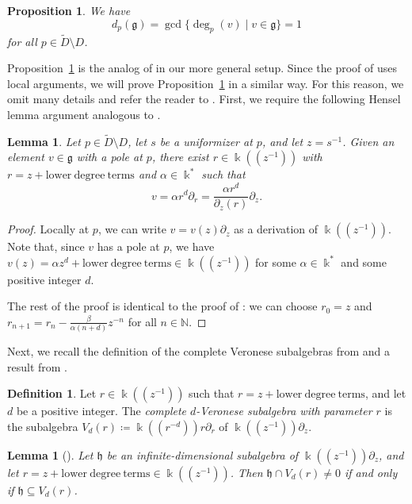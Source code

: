 \documentclass[12pt]{amsart}
\theoremstyle{plain}
\newtheorem{proposition}[theorem]{Proposition}
\newtheorem{lemma}[theorem]{Lemma}
\theoremstyle{definition}
\newtheorem{definition}[theorem]{Definition}
\numberwithin{equation}{section}
\def\g{\mathfrak{g}}
\def\h{\mathfrak{h}}
\def\NN{\mathbb{N}}
\def\kk{\Bbbk}
\def\del{\partial}
\begin{document}
\begin{proposition}\label{prop:g has almost all poles}
    We have
    $$d_p(\g) = \gcd\{\deg_p(v) \mid v \in \g\} = 1$$
    for all $p \in \widetilde{D} \setminus D$.
\end{proposition}

Proposition~\ref{prop:g has almost all poles} is the analog of \cite[Proposition 3.1]{BellBuzaglo} in our more general setup. Since the proof of \cite[Proposition 3.1]{BellBuzaglo} uses local arguments, we will prove Proposition~\ref{prop:g has almost all poles} in a similar way. For this reason, we omit many details and refer the reader to \cite{BellBuzaglo}. First, we require the following Hensel lemma argument analogous to \cite[Lemma 3.2]{BellBuzaglo}.

\begin{lemma}\label{lem:Hensel}
    Let $p \in \widetilde{D} \setminus D$, let $s$ be a uniformizer at $p$, and let $z = s^{-1}$. Given an element $v \in \g$ with a pole at $p$, there exist $r \in \kk((z^{-1}))$ with $r = z + \mathrm{lower~degree~terms}$ and $\alpha \in \kk^*$ such that
    $$v = \alpha r^d \del_r = \frac{\alpha r^d}{\del_z(r)}\del_z.$$
\end{lemma}
\begin{proof}
    Locally at $p$, we can write $v = v(z) \del_z$ as a derivation of $\kk((z^{-1}))$. Note that, since $v$ has a pole at $p$, we have $v(z) = \alpha z^d + \mathrm{lower~degree~terms} \in \kk((z^{-1}))$ for some $\alpha \in \kk^*$ and some positive integer $d$.

    The rest of the proof is identical to the proof of \cite[Lemma 3.2]{BellBuzaglo}: we can choose $r_0 = z$ and $r_{n + 1} = r_n - \frac{\beta}{\alpha (n + d)} z^{-n}$ for all $n \in \NN$.
\end{proof}

Next, we recall the definition of the complete Veronese subalgebras from \cite[Notation 3.3]{BellBuzaglo} and a result from \cite{BellBuzaglo}.

\begin{definition}
    Let $r \in \kk((z^{-1}))$ such that $r = z + \mathrm{lower~degree~terms}$, and let $d$ be a positive integer. The \emph{complete $d$-Veronese subalgebra with parameter $r$} is the subalgebra $V_d(r) \coloneqq \kk((r^{-d}))r\del_r$ of $\kk((z^{-1}))\del_z$.
\end{definition}

\begin{lemma}[{\cite[Corollary 3.5]{BellBuzaglo}}]\label{lem:contained in Veronese}
    Let $\h$ be an infinite-dimensional subalgebra of $\kk((z^{-1}))\del_z$, and let $r = z + \mathrm{lower~degree~terms} \in \kk((z^{-1}))$. Then $\h \cap V_d(r) \neq 0$ if and only if $\h \subseteq V_d(r)$.
\end{lemma}
\end{document}
